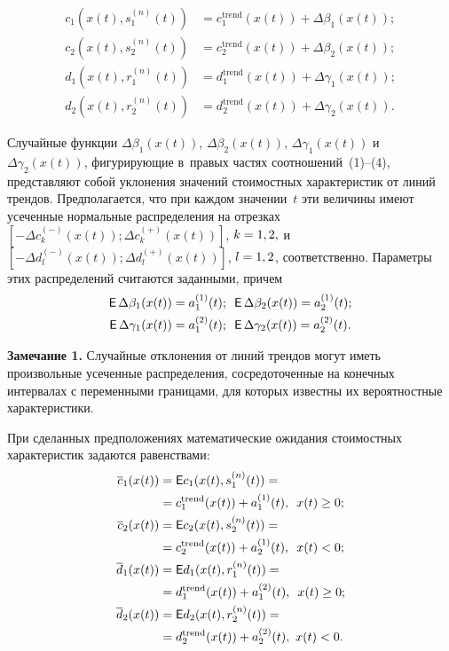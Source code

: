 \begin{multicols}{2}
\noindent
\begin{align}
c_1(x(t),s_1^{(n)}(t))&=c_1^{\mathrm{trend}}(x(t))+\Delta\beta_1(x(t));  \label{eq1}\\
c_2(x(t),s_2^{(n)}(t))&=c_2^{\mathrm{trend}}(x(t))+\Delta\beta_2(x(t)); \label{eq2}
\\
d_1(x(t),r_1^{(n)}(t))&=d_1^{\mathrm{trend}}(x(t))+\Delta\gamma_1(x(t));\label{eq3}\\
d_2(x(t),r_2^{(n)}(t))&=d_2^{\mathrm{trend}}(x(t))+\Delta\gamma_2(x(t)).
 \label{eq4}
\end{align}

Случайные функции 
$\Delta\beta_1(x(t))$, $\Delta\beta_2(x(t))$, $\Delta\gamma_1(x(t))$ и~$\Delta\gamma_2(x(t))$,
 фигурирующие в~правых частях соотношений~(1)--(4), представляют собой 
уклонения значений стоимостных характеристик от линий трендов. Предполагается,\linebreak 
что при каждом значении~$t$ эти величины имеют усеченные нормальные 
распределения на отрезках $[-\Delta c_k^{(-)}(x(t));\Delta 
c_k^{(+)}(x(t))]$, $k\hm=1,2,$ и~$[-\Delta d_l^{(-)}(x(t));\Delta 
d_l^{(+)}(x(t))]$, $l\hm=1,2$, соответственно. Параметры этих распределений считаются 
заданными, причем 
\begin{gather*}
\mathsf{E}\,\Delta\beta_1(x(t))=a_1^{(1)}(t);\enskip \mathsf{E}\,\Delta\beta_2(x(t))\hm=
a_2^{(1)}(t);\\
 \mathsf{E}\,\Delta\gamma_1(x(t))\hm=a_1^{(2)}(t);\enskip 
\mathsf{E}\,\Delta\gamma_2(x(t))=a_2^{(2)}(t).
\end{gather*}


\smallskip

\noindent
\textbf{Замечание 1.} Случайные отклонения от линий трендов могут иметь 
произвольные усеченные распределения, сосредоточенные на конечных интервалах с 
переменными границами, для которых известны их вероятностные характеристики.

При сделанных предположениях математические ожидания стоимостных характеристик 
задаются равенствами:
\begin{align}
{\overline{c}}_1(x(t))&=\mathsf{E} c_1(x(t),s_1^{(n)}(t))={}\notag \\
&{}= c_1^{\mathrm{trend}}(x(t))+a_1^{(1)}(t),\enskip x(t)\geq 0;
\label{e5-sh}\\
{\overline{c}}_2(x(t))&=\mathsf{E} c_2(x(t),s_2^{(n)}(t))={}\notag\\
&{}=c_2^{\mathrm{trend}}(x(t))+a_2^{(1)}(t),\enskip x(t)< 0; \label{e6-sh}
\\
{\overline{d}}_1(x(t))&=\mathsf{E} 
 d_1(x(t),r_1^{(n)}(t))={}\notag\\
& {}=d_1^{\mathrm{trend}}(x(t))+ a_1^{(2)}(t),\enskip x(t)\geq 0;
\label{e7-sh}\\
 {\overline{d}}_2(x(t))&=\mathsf{E}  d_2(x(t),r_2^{(n)}(t))={}\notag\\
 &{}=d_2^{\mathrm{trend}}(x(t))+a_2^{(2)}(t),~x(t)< 0.
 \label{e8-sh}
\end{align} 


\end{multicols}
